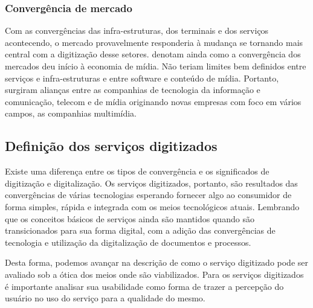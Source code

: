 \subsubsection{Convergência de mercado}

Com as convergências das infra-estruturas, dos terminais e dos serviços acontecendo, o mercado provavelmente responderia à mudança se tornando mais central com a digitização desse setores. \cite{storsul2010} denotam ainda como a convergência dos mercados deu início à economia de mídia. Não teriam limites bem definidos entre serviços e infra-estruturas e entre software e conteúdo de mídia. Portanto, surgiram alianças entre as companhias de tecnologia da informação e comunicação, telecom e de mídia originando novas empresas com foco em vários campos, as companhias multimídia.

\subsection{Definição dos serviços digitizados}

Existe uma diferença entre os tipos de convergência e os significados de digitização e digitalização. Os serviços digitizados, portanto, são resultados das convergências de várias tecnologias esperando fornecer algo ao consumidor de forma simples, rápida e integrada com os meios tecnológicos atuais. Lembrando que os conceitos básicos de serviços ainda são mantidos quando são transicionados para sua forma digital, com a adição das convergências de tecnologia e utilização da digitalização de documentos e processos. 

Desta forma, podemos avançar na descrição de como o serviço digitizado pode ser avaliado sob a ótica dos meios onde são viabilizados. Para os serviços digitizados é importante analisar sua usabilidade como forma de trazer a percepção do usuário no uso do serviço para a qualidade do mesmo.

